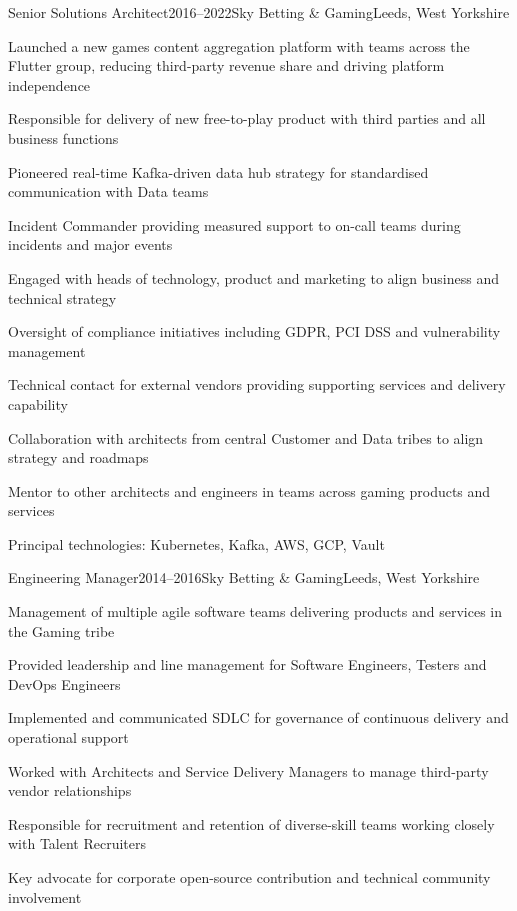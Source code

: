 \documentclass{cv}
\begin{document}
\begin{experience}{Senior Solutions Architect}{2016--2022}{Sky Betting \& Gaming}{Leeds, West Yorkshire}
\item Launched a new games content aggregation platform with teams across the Flutter group, reducing
      third-party revenue share and driving platform independence
\item Responsible for delivery of new free-to-play product with third parties and all business functions
\item Pioneered real-time Kafka-driven data hub strategy for standardised communication with Data teams
\item Incident Commander providing measured support to on-call teams during incidents and major events
\item Engaged with heads of technology, product and marketing to align business and technical strategy
\item Oversight of compliance initiatives including GDPR, PCI DSS and vulnerability management
\item Technical contact for external vendors providing supporting services and delivery capability
\item Collaboration with architects from central Customer and Data tribes to align strategy and roadmaps
\item Mentor to other architects and engineers in teams across gaming products and services
\item Principal technologies: Kubernetes, Kafka, AWS, GCP, Vault
\end{experience}


\begin{experience}{Engineering Manager}{2014--2016}{Sky Betting \& Gaming}{Leeds, West Yorkshire}
\item Management of multiple agile software teams delivering products and services in the Gaming tribe
\item Provided leadership and line management for Software Engineers, Testers and DevOps Engineers
\item Implemented and communicated SDLC for governance of continuous delivery and operational support
\item Worked with Architects and Service Delivery Managers to manage third-party vendor relationships
\item Responsible for recruitment and retention of diverse-skill teams working closely with Talent Recruiters
\item Key advocate for corporate open-source contribution and technical community involvement
\end{experience}
\end{document}
